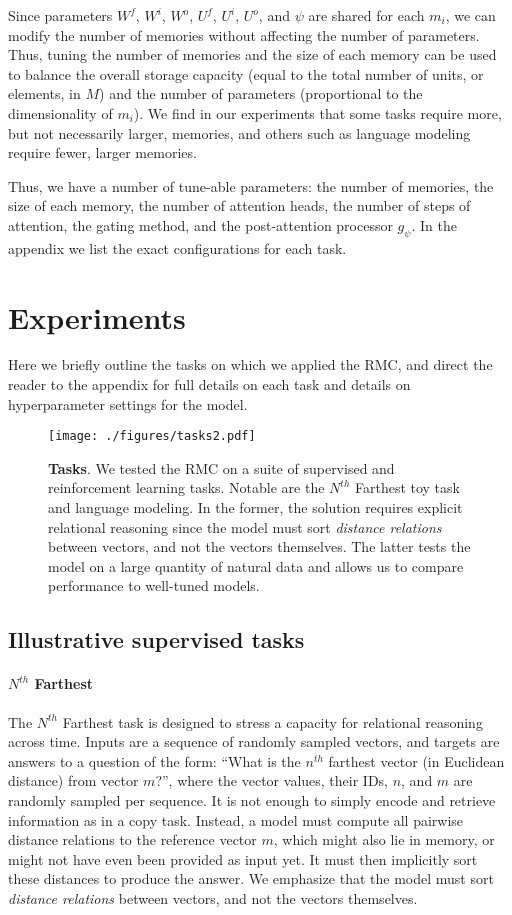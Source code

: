 \documentclass{article}
\begin{document}
Since parameters $W^f$, $W^i$, $W^o$, $U^f$, $U^i$, $U^o$, and $\psi$ are shared for each $m_i$, we can modify the number of memories without affecting the number of parameters. Thus, tuning the number of memories and the size of each memory can be used to balance the overall storage capacity (equal to the total number of units, or elements, in $M$) and the number of parameters (proportional to the dimensionality of $m_i$). We find in our experiments that some tasks require more, but not necessarily larger, memories, and others such as language modeling require fewer, larger memories.

Thus, we have a number of tune-able parameters: the number of memories, the size of each memory, the number of attention heads, the number of steps of attention, the gating method, and the post-attention processor $g_{\psi}$. In the appendix we list the exact configurations for each task. \section{Experiments}
Here we briefly outline the tasks on which we applied the RMC, and direct the reader to the appendix for full details on each task and details on hyperparameter settings for the model. 

\begin{figure}
    \centering
    \texttt{[image: ./figures/tasks2.pdf]}
    \caption{\textbf{Tasks}. We tested the RMC on a suite of supervised and reinforcement learning tasks. Notable are the $N^{th}$ Farthest toy task and language modeling. In the former, the solution requires explicit relational reasoning since the model must sort \textit{distance relations} between vectors, and not the vectors themselves. The latter tests the model on a large quantity of natural data and allows us to compare performance to well-tuned models.}
    \label{fig:tasks}
\end{figure}

\subsection{Illustrative supervised tasks}
\paragraph{$N^{th}$ Farthest}
The $N^{th}$ Farthest task is designed to stress a capacity for relational reasoning across time. Inputs are a sequence of randomly sampled vectors, and targets are answers to a question of the form: ``What is the $n^{th}$ farthest vector (in Euclidean distance) from vector $m$?'', where the vector values, their IDs, $n$, and $m$ are randomly sampled per sequence. It is not enough to simply encode and retrieve information as in a copy task. Instead, a model must compute all pairwise distance relations to the reference vector $m$, which might also lie in memory, or might not have even been provided as input yet. It must then implicitly sort these distances to produce the answer. We emphasize that the model must sort \textit{distance relations} between vectors, and not the vectors themselves.
\end{document}
